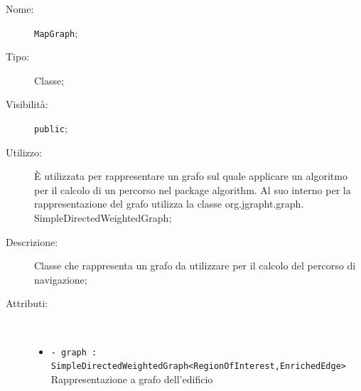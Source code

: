\documentclass[../DefinizioneDiProdotto.tex]{subfiles}
\begin{document}
\begin{description}
	\item[Nome:] \texttt{MapGraph};
	\item[Tipo:] Classe;
	\item[Visibilità:] \texttt{public};
	\item[Utilizzo:] È utilizzata per rappresentare un grafo sul quale applicare un algoritmo per il calcolo di un percorso nel package algorithm. Al suo interno per la rappresentazione del grafo utilizza la classe org.jgrapht.graph.\\SimpleDirectedWeightedGraph;
	\item[Descrizione:] Classe che rappresenta un grafo da utilizzare per il calcolo del percorso di navigazione;
	\item[Attributi:] \
	\begin{itemize}
		\item \texttt{- graph : SimpleDirectedWeightedGraph<RegionOfInterest,EnrichedEdge>}\\
		Rappresentazione a grafo dell'edificio
		

\end{itemize}
\end{description}
\end{document}
